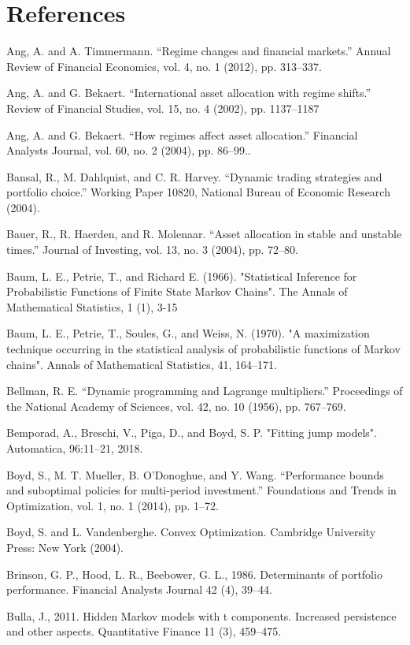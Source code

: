 \newpage
\section{References}

Ang, A. and A. Timmermann. “Regime changes and financial markets.” Annual Review of Financial Economics, vol. 4, no. 1 (2012), pp. 313–337.

Ang, A. and G. Bekaert. “International asset allocation with regime shifts.” Review of Financial Studies, vol. 15, no. 4 (2002), pp. 1137–1187

Ang, A. and G. Bekaert. “How regimes affect asset allocation.” Financial Analysts Journal, vol. 60, no. 2 (2004), pp. 86–99..

Bansal, R., M. Dahlquist, and C. R. Harvey. “Dynamic trading strategies and portfolio choice.” Working Paper 10820, National Bureau of Economic Research (2004).

Bauer, R., R. Haerden, and R. Molenaar. “Asset allocation in stable and unstable times.” Journal of Investing, vol. 13, no. 3 (2004), pp. 72–80.

Baum, L. E., Petrie, T., and Richard E. (1966). "Statistical Inference for Probabilistic Functions of Finite State Markov Chains". The Annals of Mathematical Statistics, 1 (1), 3-15

Baum, L. E., Petrie, T., Soules, G., and Weiss, N. (1970). "A maximization technique occurring in the
statistical analysis of probabilistic functions of Markov chains". Annals of Mathematical Statistics, 41, 164–171.

Bellman, R. E. “Dynamic programming and Lagrange multipliers.” Proceedings of the National Academy of Sciences, vol. 42, no. 10 (1956), pp. 767–769.

Bemporad, A., Breschi, V., Piga, D., and Boyd, S. P. "Fitting jump models". Automatica, 96:11–21, 2018.

Boyd, S., M. T. Mueller, B. O’Donoghue, and Y. Wang. “Performance bounds and suboptimal policies for multi-period investment.” Foundations and Trends in Optimization, vol. 1, no. 1 (2014), pp. 1–72.

Boyd, S. and L. Vandenberghe. Convex Optimization. Cambridge University Press: New York (2004).

Brinson, G. P., Hood, L. R., Beebower, G. L., 1986. Determinants of portfolio performance. Financial Analysts Journal 42 (4), 39–44.

Bulla, J., 2011. Hidden Markov models with t components. Increased persistence and other aspects. Quantitative Finance 11 (3), 459–475.

